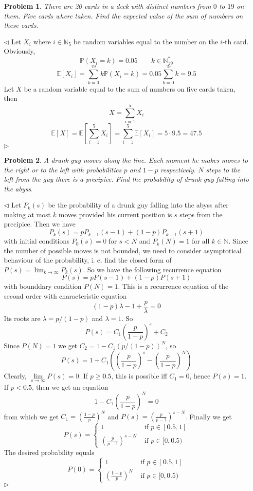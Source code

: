 \documentclass[12pt]{article}
\newtheorem{problem}{Problem}[subsection]
\newenvironment{solution}{\par $\triangleleft$}{$\triangleright$}
\begin{document}
 
\begin{problem} There are 20 cards in a deck with distinct numbers from $0$ to $19$ on them. Five cards where taken. Find the expected value of the sum of numbers on these cards.
\end{problem}
\begin{solution} Let $X_i$ where $i\in \mathbb{N}_5$ be random variables equal to the number on the $i$-th card. Obviously,
$$
\mathbb{P}({X_i=k})=0.05\qquad k\in\mathbb{N}_{19}^*
$$
$$
\mathbb{E}[X_i]=\sum_{k=0}^{19}k\mathbb{P}({X_i=k})=0.05\sum_{k=0}^19 k=9.5
$$
Let $X$ be a random variable equal to the sum of numbers on five cards taken, then
$$
X=\sum_{i=1}^5 X_i
$$
$$
\mathbb{E}[X]=\mathbb{E}\left[\sum_{i=1}^5 X_i\right]=\sum_{i=1}^5\mathbb{E}[X_i]=5\cdot 9.5=47.5
$$
\end{solution}
 
 
\begin{problem} A drunk guy moves along the line. Each moment he makes moves to the right or to the left with probabilities $p$ and $1-p$ respectively. $N$ steps to the left from the guy there is a precipice. Find the probability of drunk guy falling into the abyss.
\end{problem}
\begin{solution} Let $P_k(s)$ be the probability of a drunk guy falling into the abyss after making at most $k$ moves provided his current position is $s$ steps from the precipice. Then we have
$$
P_k(s)=pP_{k-1}(s-1)+(1-p)P_{k-1}(s+1)
$$
with initial conditions $P_0(s)=0$ for $s<N$ and $P_k(N)=1$ for all $k\in\mathbb{N}$. Since the number of possible moves is not bounded, we need to consider asymptotical behaviour of the probability, i. e. find the closed form of $P(s)=\lim_{k\to\infty} P_k(s)$. So we have the following recurrence equation
$$
P(s)=pP(s-1)+(1-p)P(s+1)
$$
with bounddary condition $P(N)=1$. This is a recurrence equation of the second order with characteristic equation
$$
(1-p)\lambda-1+\frac{p}{\lambda}=0
$$
Its roots are $\lambda=p/(1-p)$ and $\lambda=1$. So 
$$
P(s)=C_1\left(\frac{p}{1-p}\right)^s+C_2
$$
Since $P(N)=1$ we get $C_2=1-C_1(p/(1-p))^N$, so 
$$
P(s)=1+C_1\left(\left(\frac{p}{1-p}\right)^s-\left(\frac{p}{1-p}\right)^N\right)
$$
Clearly, $\lim\limits_{s\to\infty}P(s)=0$. If $p\geq 0.5$, this is possible iff $C_1=0$, hence $P(s)=1$. If $p<0.5$, then we get an equation
$$
1-C_1\left(\frac{p}{1-p}\right)^N=0
$$
from which we get $C_1=\left(\frac{1-p}{p}\right)^N$ and $P(s)=\left(\frac{p}{p-1}\right)^{s-N}$. Finally we get
$$
P(s)=\begin{cases} 1&\mbox{ if }p\in[0.5,1]\\ \left(\frac{p}{p-1}\right)^{s-N}&\mbox{ if }p\in[0,0.5)
\end{cases}
$$
The desired  probability equals
$$
P(0)=\begin{cases} 1&\mbox{ if }p\in[0.5,1]\\ \left(\frac{1-p}{p}\right)^{N}&\mbox{ if }p\in[0,0.5)
\end{cases}
$$
\end{solution}
 
\end{document}
